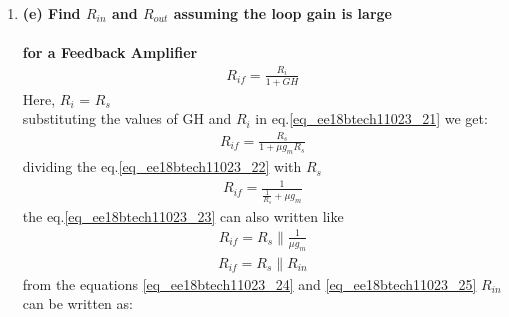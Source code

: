 \begin{enumerate}[label=\thesection.\arabic*.,ref=\thesection.\theenumi]
\item
\label{Question_1e_ee18btech11023}
\textbf{
(e) Find $R_{in}$ and $R_{out}$ assuming the loop gain is large}\\
\solution\\
\textbf{for a Feedback Amplifier }
\begin{align}
    R_{if} = \frac{R_{i}}{1+GH}
    \label{eq_ee18btech11023_21}
\end{align}
Here,
    $R_{i}$ =  $R_{s}$\\
substituting the values of GH and $R_{i}$ in eq.\ref{eq_ee18btech11023_21}\;\;\; we get:
\begin{align}
    R_{if} = \frac{R_s}{1+\mu g_m R_s}
    \label{eq_ee18btech11023_22}
\end{align}
dividing the eq.\ref{eq_ee18btech11023_22} with $R_s$
\begin{align}
    R_{if} = \frac{1}{\frac{1}{R_s} + \mu g_m}
    \label{eq_ee18btech11023_23}
\end{align}
the eq.\ref{eq_ee18btech11023_23} can also written like
\begin{align}
    R_{if} = R_{s} \parallel  \frac{1}{\mu g_m}
    \label{eq_ee18btech11023_24}
\end{align}
\begin{align}
    R_{if} = R_s \parallel R_{in}
    \label{eq_ee18btech11023_25}
\end{align}
 from the equations \ref{eq_ee18btech11023_24} and \ref{eq_ee18btech11023_25} $R_{in}$ can be written as:


\end{enumerate}
